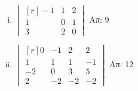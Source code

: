 \begin{enumerate}
\begin{enumerate}[i),itemsep=10pt]
      \item $\begin{vmatrix*}[r]
            -1 & 1 & 2 \\
            1 & 0 & 1 \\
            3 & 2 & 0 
        \end{vmatrix*}$
    \hfill Απ: 9 

  \item $\begin{vmatrix*}[r]
        0 & -1 & 2 & 2 \\
        1 & 1 & 1 & -1 \\
        -2 & 0 & 3 & 5 \\
        2 & -2 & -2 & -2
    \end{vmatrix*}$
\hfill Απ: 12  

\end{enumerate}

\end{enumerate}



